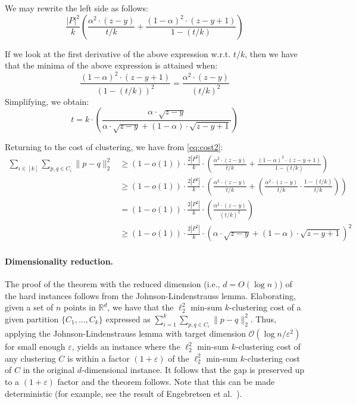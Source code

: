\documentclass[11pt]{article}
\renewcommand{\O}[1]{\ensuremath{\mathcal{O}\left(#1\right)}}
\newcommand{\eps}{\varepsilon}
\begin{document}
We may rewrite the left side as follows:
$$ \frac{|P|^2}{k}\left(   \frac{\alpha^2\cdot (z-y) }{t/k}   +    \frac{(1-\alpha)^2\cdot (z-y+1)}{1-(t/k)}  \right)$$

If we look at the first derivative of the above expression w.r.t. $t/k$, then we have that the minima of the above expression is attained when:
$$\frac{(1-\alpha)^2\cdot (z-y+1)}{(1-(t/k))^2}=\frac{\alpha^2\cdot (z-y)}{(t/k)^2}$$
Simplifying, we obtain:
$$t=k\cdot \left(\frac{\alpha\cdot \sqrt{z-y}}{\alpha\cdot \sqrt{z-y}+(1-\alpha)\cdot \sqrt{z-y+1}}\right)$$




Returning to the cost of clustering, we have from \eqref{eq:cost2}:
\begin{align*}
 \sum_{i\in[k]}\sum_{p,q\in C_i}\|p-q\|_2^2 
&\geq   (1-o(1))\cdot  \frac{2|P^2|}{k} \cdot \left(   \frac{\alpha^2\cdot (z-y) }{t/k}   +    \frac{(1-\alpha)^2\cdot (z-y+1)}{1-(t/k)}  \right)\\
&\geq (1-o(1))\cdot  \frac{2|P^2|}{k} \cdot \left(   \frac{\alpha^2\cdot (z-y) }{t/k}   +  \left(\frac{\alpha^2\cdot (z-y) }{t/k} \cdot\frac{1-(t/k)}{t/k}\right) \right)\\
&=  (1-o(1))\cdot  \frac{2|P^2|}{k} \cdot \left(  \frac{\alpha^2\cdot (z-y) }{  (t/k)^2}  \right)\\
&\ge (1-o(1))\cdot  \frac{2|P^2|}{k} \cdot    \left(\alpha\cdot \sqrt{z-y}+(1-\alpha)\cdot \sqrt{z-y+1}\right)^{2} 
\end{align*} 

\paragraph{Dimensionality reduction.}
The proof of the theorem with the reduced dimension (i.e., $d=O(\log n)$) of the hard instances follows from the Johnson-Lindenstrauss lemma. 
Elaborating, given a set of $n$ points in $\mathbb{R}^d$, we have that the $\ell_2^2$ min-sum $k$-clustering cost of a given partition $\{C_1,\ldots,C_k\}$   expressed as $\sum_{i=1}^k   \sum_{p,q \in C_i} \|p-q\|^2_2$. 
Thus, applying the Johnson-Lindenstrauss lemma with target dimension $\O{\log n/\eps^2}$ for small enough $\eps$, yields an instance where the $\ell_2^2$ min-sum $k$-clustering cost of any clustering $C$ is within a factor $(1+\eps)$ of the $\ell_2^2$ min-sum $k$-clustering cost of $C$ in the original $d$-dimensional instance. 
It follows that the gap is preserved up to a $(1+\eps)$ factor and the theorem follows. 
Note that this can be made deterministic (for example, see the result of Engebretsen et al.~\cite{EIO02}). 
\end{document}
